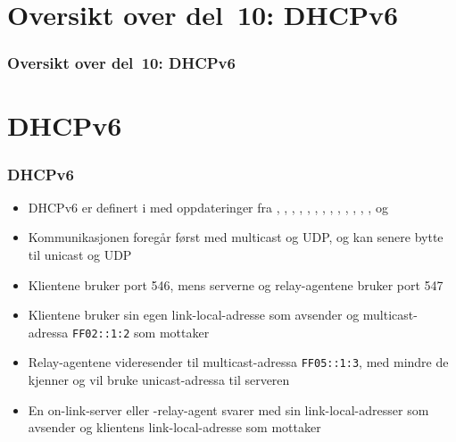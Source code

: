 \section*{Oversikt over del~10: DHCPv6}
\begin{frame}[allowframebreaks]
  \frametitle{Oversikt over del~10: DHCPv6}
    \tableofcontents%
\end{frame}

\section{DHCPv6}
\begin{frame}%
  \frametitle{DHCPv6}
  \begin{itemize}%
  \item DHCPv6 er definert i  med oppdateringer fra
    , , , , ,
    , , , , ,
    , , ,  og 
  \item Kommunikasjonen foregår først med multicast og UDP, og kan
    senere bytte til unicast og UDP
  \item Klientene bruker port 546, mens serverne og relay-agentene
    bruker port 547
  \item Klientene bruker sin egen link-local-adresse som avsender og
    multicast-adressa \texttt{FF02::1:2} som mottaker
  \item Relay-agentene videresender til multicast-adressa
    \texttt{FF05::1:3}, med mindre de kjenner og vil bruke
    unicast-adressa til serveren
  \item En on-link-server eller -relay-agent svarer med sin
    link-local-adresser som avsender og klientens link-local-adresse
    som mottaker
  \end{itemize}
\end{frame}

